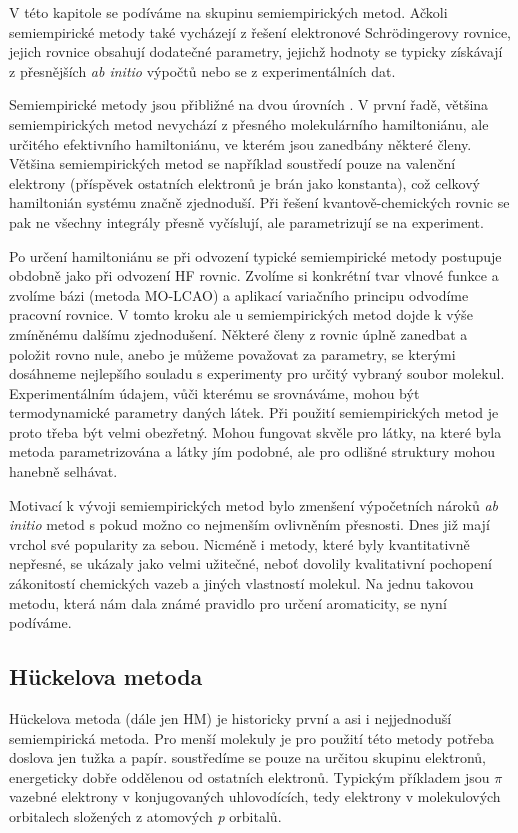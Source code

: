 V této kapitole se podíváme na skupinu semiempirických metod. Ačkoli semiempirické metody také vycházejí z řešení elektronové Schr\"{o}dingerovy rovnice, jejich rovnice obsahují dodatečné parametry, jejichž hodnoty se typicky získávají z přesnějších \textit{ab initio} výpočtů nebo se z experimentálních dat.

Semiempirické metody jsou přibližné na dvou úrovních . V první řadě, většina semiempirických metod nevychází z přesného molekulárního hamiltoniánu, ale určitého efektivního hamiltoniánu, ve kterém jsou zanedbány některé členy. Většina semiempirických metod se například soustředí pouze na valenční elektrony (příspěvek ostatních elektronů je brán jako konstanta), což celkový hamiltonián systému značně zjednoduší. Při řešení kvantově-chemických rovnic se pak ne všechny integrály přesně vyčíslují, ale parametrizují se na experiment. 

Po určení hamiltoniánu se při odvození typické semiempirické metody postupuje obdobně jako při odvození HF rovnic. Zvolíme si konkrétní tvar vlnové funkce a zvolíme bázi (metoda MO-LCAO) a aplikací variačního principu odvodíme pracovní rovnice. V tomto kroku ale u semiempirických metod dojde k výše zmíněnému dalšímu zjednodušení. Některé členy z rovnic úplně zanedbat a položit rovno nule, anebo je můžeme považovat za parametry, se kterými dosáhneme nejlepšího souladu s experimenty pro určitý vybraný soubor molekul. Experimentálním údajem, vůči kterému se srovnáváme, mohou být termodynamické parametry daných látek. Při použití semiempirických metod je proto třeba být velmi obezřetný. Mohou fungovat skvěle pro látky, na které byla metoda parametrizována a látky jím podobné, ale pro odlišné struktury mohou hanebně selhávat.  

Motivací k vývoji semiempirických metod bylo zmenšení výpočetních nároků \textit{ab initio} metod s pokud možno co nejmenším ovlivněním přesnosti. Dnes již mají vrchol své popularity za sebou. Nicméně i metody, které byly kvantitativně nepřesné, se ukázaly jako velmi užitečné, neboť dovolily kvalitativní pochopení zákonitostí chemických vazeb a jiných vlastností molekul. Na jednu takovou metodu, která nám dala známé pravidlo  pro určení aromaticity, se nyní podíváme.

\subsection{H\"{u}ckelova metoda}

H\"{u}ckelova metoda (dále jen HM) je historicky první a asi i nejjednoduší semiempirická metoda. Pro menší molekuly je pro použití této metody potřeba doslova jen tužka a papír. soustředíme se pouze na určitou skupinu elektronů, energeticky dobře oddělenou od ostatních elektronů. Typickým příkladem jsou $\pi$ vazebné elektrony v konjugovaných uhlovodících,
tedy elektrony v molekulových orbitalech složených z atomových \textit{p} orbitalů.
 

